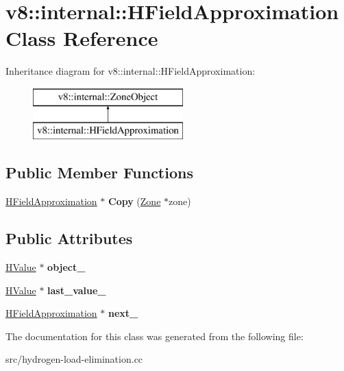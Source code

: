 \hypertarget{classv8_1_1internal_1_1_h_field_approximation}{}\section{v8\+:\+:internal\+:\+:H\+Field\+Approximation Class Reference}
\label{classv8_1_1internal_1_1_h_field_approximation}
Inheritance diagram for v8\+:\+:internal\+:\+:H\+Field\+Approximation\+:\begin{figure}[H]
\begin{center}
\leavevmode
\includegraphics[height=2.000000cm]{classv8_1_1internal_1_1_h_field_approximation}
\end{center}
\end{figure}
\subsection*{Public Member Functions}
\begin{DoxyCompactItemize}
\item 
\hypertarget{classv8_1_1internal_1_1_h_field_approximation_a670b121b7bc412e75ae29fb41433212a}{}\hyperlink{classv8_1_1internal_1_1_h_field_approximation}{H\+Field\+Approximation} $\ast$ {\bfseries Copy} (\hyperlink{classv8_1_1internal_1_1_zone}{Zone} $\ast$zone)\label{classv8_1_1internal_1_1_h_field_approximation_a670b121b7bc412e75ae29fb41433212a}

\end{DoxyCompactItemize}
\subsection*{Public Attributes}
\begin{DoxyCompactItemize}
\item 
\hypertarget{classv8_1_1internal_1_1_h_field_approximation_a6750e948b9c757737e93f69ac063bed7}{}\hyperlink{classv8_1_1internal_1_1_h_value}{H\+Value} $\ast$ {\bfseries object\+\_\+}\label{classv8_1_1internal_1_1_h_field_approximation_a6750e948b9c757737e93f69ac063bed7}

\item 
\hypertarget{classv8_1_1internal_1_1_h_field_approximation_aeaa585d0829deffb35302b975071f329}{}\hyperlink{classv8_1_1internal_1_1_h_value}{H\+Value} $\ast$ {\bfseries last\+\_\+value\+\_\+}\label{classv8_1_1internal_1_1_h_field_approximation_aeaa585d0829deffb35302b975071f329}

\item 
\hypertarget{classv8_1_1internal_1_1_h_field_approximation_ab61c7a4adb07c406f4de7f0273b2eaf9}{}\hyperlink{classv8_1_1internal_1_1_h_field_approximation}{H\+Field\+Approximation} $\ast$ {\bfseries next\+\_\+}\label{classv8_1_1internal_1_1_h_field_approximation_ab61c7a4adb07c406f4de7f0273b2eaf9}

\end{DoxyCompactItemize}


The documentation for this class was generated from the following file\+:\begin{DoxyCompactItemize}
\item 
src/hydrogen-\/load-\/elimination.\+cc\end{DoxyCompactItemize}
